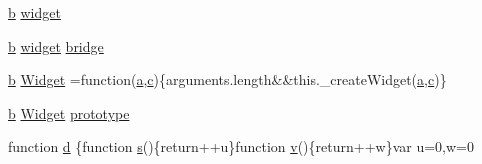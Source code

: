 \begin{DoxyCompactItemize}
\item 
\hyperlink{media_2js_2jquery_8js_ac0431efac4d7c393d1e70b86115cb93f}{b} \hyperlink{jquery-ui-tabs_8js_a60d5947424f4fcd4ca9ed05e6dc43227}{widget}
\item 
\hyperlink{media_2js_2jquery_8js_ac0431efac4d7c393d1e70b86115cb93f}{b} \hyperlink{jquery_8mobile-1_83_81_8js_ac4a01edf7e49cc35291bb23e78a07acf}{widget} \hyperlink{jquery-ui-tabs_8js_a076eb0dcbd23c16543468b58486870f5}{bridge}
\item 
\hyperlink{media_2js_2jquery_8js_ac0431efac4d7c393d1e70b86115cb93f}{b} \hyperlink{jquery-ui-tabs_8js_ac118a4c29a2ace98e4c956a7e504390d}{Widget} =function(\hyperlink{media_2js_2jquery_8js_aa4d4888597588a84fd5b1184d00c91f3}{a},\hyperlink{fullpage_2plugin_8min_8js_a92587cc54822a9f38871b2d0e0952da1}{c})\{arguments.\+length\&\&this.\+\_\+create\+Widget(\hyperlink{media_2js_2jquery_8js_aa4d4888597588a84fd5b1184d00c91f3}{a},\hyperlink{fullpage_2plugin_8min_8js_a92587cc54822a9f38871b2d0e0952da1}{c})\}
\item 
\hyperlink{media_2js_2jquery_8js_ac0431efac4d7c393d1e70b86115cb93f}{b} \hyperlink{jquery_8mobile-1_83_81_8js_afc4c2169b499b3ea4e8c3e0924a3df4f}{Widget} \hyperlink{jquery-ui-tabs_8js_a27300e4442d1d6583d40af9f4aba4716}{prototype}
\item 
function \hyperlink{jquery-ui-tabs_8js_a36541169dfff685f807208881a4f0021}{d} \{function \hyperlink{validate_8js_ae059f217efaf1d50696a1214c3ce5748}{s}()\{return++u\}function \hyperlink{jquery_8fancybox_8pack_8js_a207400f40ed647015069564fa40946e1}{v}()\{return++w\}var u=0,w=0
\end{DoxyCompactItemize}


